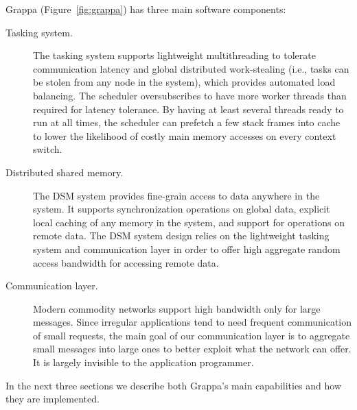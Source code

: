 Grappa (Figure~\ref{fig:grappa}) has three main software components:
\begin{description}

\item [Tasking system.] The tasking system supports lightweight multithreading
to tolerate communication latency and global distributed work-stealing (i.e.,
tasks can be stolen from any node in the system), which provides automated
load balancing. The scheduler oversubscribes to have more worker
threads than required for latency tolerance. By having at least
several threads ready to run at all times, the scheduler can prefetch
a few stack frames into cache to lower the likelihood of costly main
memory accesses on every context switch.

\item[Distributed shared memory.] The DSM system provides
fine-grain access to data anywhere in the system. It supports synchronization
operations on global data, explicit local caching of any memory in the system,
and support for operations on remote data.
The DSM system design relies on the lightweight tasking system and
communication layer in order to offer high aggregate random
access bandwidth for accessing remote data.

\item[Communication layer.] Modern commodity networks
support high bandwidth only for large messages. Since irregular applications
tend to need frequent communication of small requests, the main goal of our
communication layer is to aggregate small messages into large ones to better
exploit what the network can offer. It is largely invisible to the application
programmer.


\end{description}



In the next three sections we describe both Grappa's main capabilities and how they are implemented.

